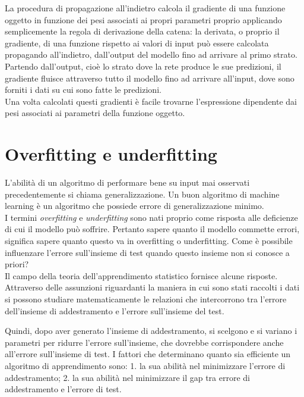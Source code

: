  La procedura di propagazione all’indietro calcola il gradiente di una funzione oggetto
  in funzione dei pesi associati ai propri parametri proprio applicando semplicemente 
  la regola di derivazione della catena: la derivata, o proprio il gradiente, di una 
  funzione rispetto ai valori di input può essere calcolata propagando all’indietro,
   dall’output del modello fino ad arrivare al primo strato. 
   Partendo dall’output, cioè lo strato dove la rete produce le sue predizioni,
    il gradiente fluisce attraverso tutto il modello fino ad arrivare all’input, 
    dove sono forniti i dati su cui sono fatte le predizioni.\\
     Una volta calcolati questi gradienti è facile trovarne l’espressione
      dipendente dai pesi associati ai parametri della funzione oggetto.\\
    


 
\section{Overfitting e underfitting}
L’abilità di un algoritmo di performare bene su input mai osservati precedentemente si chiama
 generalizzazione. Un buon algoritmo di machine learning è un algoritmo che possiede errore 
 di generalizzazione minimo. \\
I termini \emph{overfitting} e \emph{underfitting} sono nati proprio come risposta alle deficienze di cui 
il modello può soffrire. Pertanto sapere quanto il modello commette errori, significa sapere
 quanto questo va in overfitting o underfitting. 
Come è possibile influenzare l’errore sull’insieme di test quando 
questo insieme non si conosce a priori?\\
 Il campo della teoria dell’apprendimento statistico fornisce 
alcune risposte. Attraverso delle assunzioni riguardanti la maniera in cui sono stati raccolti
 i dati si possono studiare matematicamente le relazioni che intercorrono tra l’errore dell’insieme
  di addestramento e l’errore sull’insieme del test.

Quindi, dopo aver generato l’insieme di addestramento, si scelgono e si variano i parametri per
 ridurre l’errore sull’insieme, che dovrebbe corrispondere anche all’errore sull’insieme di test.
I fattori che determinano quanto sia efficiente un algoritmo di apprendimento sono:
1. la sua abilità nel minimizzare l’errore di addestramento;
2. la sua abilità nel minimizzare il gap tra errore di addestramento e l’errore di test.\\

